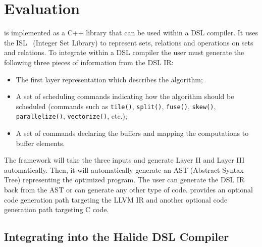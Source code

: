 \section{Evaluation}

\framework is implemented as a C++ library that can be used within a DSL compiler.  It uses the ISL~\cite{verdoolaege_isl:_2010} (Integer Set Library) to represent sets, relations and operations on sets and relations.  To integrate \framework within a DSL compiler the user must generate the following three pieces of information from the DSL IR:
\begin{itemize}
    \item The first layer representation which describes the algorithm;
    \item A set of scheduling commands indicating how the algorithm should be scheduled (commands such as \lstinline{tile()}, \lstinline{split()}, \lstinline{fuse()}, \lstinline{skew()}, \lstinline{parallelize()}, \lstinline{vectorize()}, etc.);
    \item A set of commands declaring the buffers and mapping the computations to buffer elements.
\end{itemize}
The \framework framework will take the three inputs and generate Layer II and Layer III automatically.
Then, it will automatically generate an AST (Abstract Syntax Tree) representing the optimized program.  The user can generate the DSL IR back from the AST or can generate any other type of code.  \framework provides an optional code generation path targeting the LLVM IR and another optional code generation path targeting C code.

\subsection{Integrating \framework into the Halide DSL Compiler}


